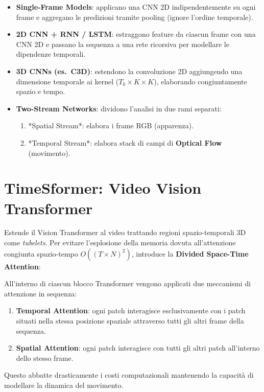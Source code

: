 \documentclass[12pt, a4paper]{report}
\begin{document}
\begin{itemize}
  \item \textbf{Single-Frame Models}: applicano una CNN 2D indipendentemente su ogni
        frame e aggregano le predizioni tramite pooling (ignore l'ordine temporale).
  \item \textbf{2D CNN + RNN / LSTM}: estraggono feature da ciascun frame con una CNN
        2D e passano la sequenza a una rete ricorsiva per modellare le dipendenze temporali.
  \item \textbf{3D CNNs (es.\ C3D)}: estendono la convoluzione 2D aggiungendo una dimensione
        temporale ai kernel ($T_k \times K \times K$), elaborando congiuntamente spazio e tempo.
  \item \textbf{Two-Stream Networks}: dividono l'analisi in due rami separati:
        \begin{enumerate}
          \item *Spatial Stream*: elabora i frame RGB (apparenza).
          \item *Temporal Stream*: elabora stack di campi di \textbf{Optical Flow} (movimento).
        \end{enumerate}
\end{itemize}

\section{TimeSformer: Video Vision Transformer}

Estende il Vision Transformer al video trattando regioni spazio-temporali 3D come
\emph{tubelets}. Per evitare l'esplosione della memoria dovuta all'attenzione congiunta
spazio-tempo $O((T \times N)^2)$, introduce la \textbf{Divided Space-Time Attention}:

\begin{defbox}
All'interno di ciascun blocco Transformer vengono applicati due meccanismi di attenzione
in sequenza:
\begin{enumerate}
  \item \textbf{Temporal Attention}: ogni patch interagisce esclusivamente con i patch
        situati nella stessa posizione spaziale attraverso tutti gli altri frame della sequenza.
  \item \textbf{Spatial Attention}: ogni patch interagisce con tutti gli altri patch
        all'interno dello stesso frame.
\end{enumerate}
Questo abbatte drasticamente i costi computazionali mantenendo la capacità di modellare
la dinamica del movimento.
\end{defbox}
\end{document}
